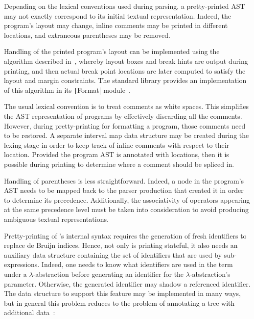 Depending on the lexical conventions used during parsing, a pretty-printed \ac{AST} may not exactly correspond to its initial textual representation.
Indeed, the program's layout may change, inline comments may be printed in different locations, and extraneous parentheses may be removed.

Handling of the printed program's layout can be implemented using the algorithm described in~\cite{oppen1980prettyprinting}, whereby layout boxes and break hints are output during printing, and then actual break point locations are later computed to satisfy the layout and margin constraints.
The \OCaml standard library provides an implementation of this algorithm in its \texttt|Format| module~\cite{leroy2022ocaml}.

The usual lexical convention is to treat comments as white spaces.
This simplifies the \ac{AST} representation of programs by effectively discarding all the comments.
However, during pretty-printing for formatting a program, those comments need to be restored.
A separate interval map data structure may be created during the lexing stage in order to keep track of inline comments with respect to their location.
Provided the program \ac{AST} is annotated with locations, then it is possible during printing to determine where a comment should be spliced in.

Handling of parentheses is less straightforward.
Indeed, a node in the program's \ac{AST} needs to be mapped back to the parser production that created it in order to determine its precedence.
Additionally, the associativity of operators appearing at the same precedence level must be taken into consideration to avoid producing ambiguous textual representations.


Pretty-printing of \Beluga's internal syntax requires the generation of fresh identifiers to replace de Bruijn indices.
Hence, not only is printing stateful, it also needs an auxiliary data structure containing the set of identifiers that are used by sub-expressions.
Indeed, one needs to know what identifiers are used in the term under a $\lambda$-abstraction before generating an identifier for the $\lambda$-abstraction's parameter.
Otherwise, the generated identifier may shadow a referenced identifier.
The data structure to support this feature may be implemented in many ways, but in general this problem reduces to the problem of annotating a tree with additional data~\cite{najd2016trees}:

